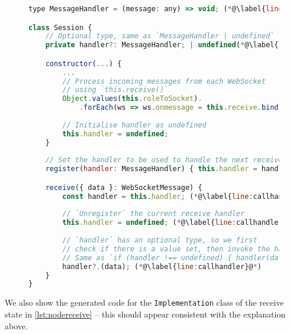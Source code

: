 \begin{figure}[!h]
\begin{lstlisting}[language=javascript,tabsize=2]
type MessageHandler = (message: any) => void; (*@\label{line:msghandler}@*)

class Session {
	// Optional type, same as `MessageHandler | undefined`
	private handler?: MessageHandler; | undefined(*@\label{line:noderuntimehandler}@*)

	constructor(...) {
		...
		// Process incoming messages from each WebSocket
		// using `this.receive()`
		Object.values(this.roleToSocket).
			.forEach(ws => ws.onmessage = this.receive.bind(this)); (*@\label{line:wsbind}@*)
			
		// Initialise handler as undefined
		this.handler = undefined;
	}
	
	// Set the handler to be used to handle the next receive event
	register(handler: MessageHandler) { this.handler = handler; } (*@\label{line:register}@*)

	receive({ data }: WebSocketMessage) {
		const handler = this.handler; (*@\label{line:callhandlerstart}@*)
		
		// `Unregister` the current receive handler
		this.handler = undefined; (*@\label{line:callhandler2}@*)
		
		// `handler` has an optional type, so we first
		// check if there is a value set, then invoke the handler.
		// Same as `if (handler !== undefined) { handler(data); }`
		handler?.(data); (*@\label{line:callhandler}@*)
	}
}
\end{lstlisting}
\label{lst:noderuntimewsmsg}
\end{figure}

We also show the generated code for the \texttt{Implementation}
class of the receive state in \cref{lst:nodereceive}
-- this should appear consistent
with the explanation above.

